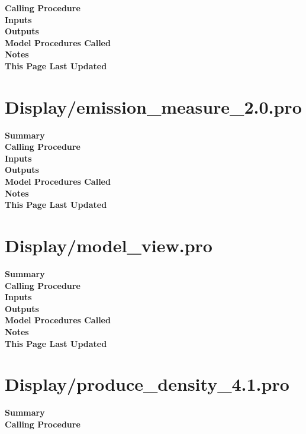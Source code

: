 \documentclass[11pt]{article}
\newcommand\descrip[1]{\textsf{\textbf{\large{#1}}}\\}
\begin{document}
\descrip{Calling Procedure}

\descrip{Inputs}

\descrip{Outputs}

\descrip{Model Procedures Called}

\descrip{Notes}

\descrip{This Page Last Updated}

\clearpage

\section{Display/emission\_measure\_2.0.pro} \label{sec:emission_measure}

\descrip{Summary}

\descrip{Calling Procedure}

\descrip{Inputs}

\descrip{Outputs}

\descrip{Model Procedures Called}

\descrip{Notes}

\descrip{This Page Last Updated}

\clearpage

\section{Display/model\_view.pro} \label{sec:model_view}

\descrip{Summary}

\descrip{Calling Procedure}

\descrip{Inputs}

\descrip{Outputs}

\descrip{Model Procedures Called}

\descrip{Notes}

\descrip{This Page Last Updated}

\clearpage

\section{Display/produce\_density\_4.1.pro} \label{sec:produce_density}

\descrip{Summary}

\descrip{Calling Procedure}
\end{document}
